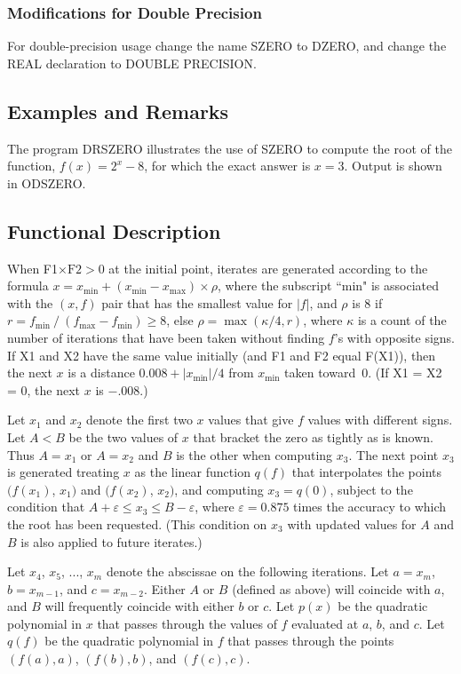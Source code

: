 \documentclass[twoside]{MATH77}
\begin{document}
\subsubsection{Modifications for Double Precision}

For double-precision usage change the name SZERO to DZERO, and change the
REAL declaration to DOUBLE PRECISION.

\subsection{Examples and Remarks}

The program DRSZERO illustrates the use of SZERO to compute the root of the
function, $f(x) = 2^x - 8$, for which the exact answer is $x =
3$. Output is shown in ODSZERO.

\subsection{Functional Description}

When F1$\times \text{F2} > 0$ at the initial point, iterates are generated
according to the formula $x = x_{\min } + (x_{\min } - x_{\max }) \times
\rho$, where the subscript ``min" is associated with the $(x, f)$ pair
that has the smallest value for $|f|$, and $\rho $ is 8 if $r = f_{\min
}\:/\:(f_{\max } - f_{\min }) \geq 8$, else $\rho = \max (\kappa /4, r)$,
where $\kappa $ is a count of the number of iterations that have been
taken without finding $f$'s with opposite signs.  If X1 and X2 have the
same value initially (and F1 and F2 equal F(X1)), then the next $x$ is a
distance $0.008 + |x_{\min }|/4$ from $x_{\min }$ taken toward~0.  (If
X1 = X2 = 0, the next $x$ is $-$.008.)

Let $x_1$ and $x_2$ denote the first two $x$ values that give $f$ values
with different signs. Let $A < B$ be the two values of $x$ that bracket the
zero as tightly as is known. Thus $A = x_1$ or $A = x_2$ and $B$ is the
other when computing $x_3$. The next point $x_3$ is generated treating $x$
as the linear function $q(f)$ that interpolates the points $(f(x_1)$, $x_1)$
and $(f(x_2)$, $x_2)$, and computing $x_3 = q(0)$, subject to the condition
that $A+\varepsilon  \leq x_3 \leq B-\varepsilon $,
where $\varepsilon  = 0.875$ times the accuracy to which the root has been
requested. (This condition on $x_3$ with updated values for $A$ and $B$
is also applied to future iterates.)

Let $x_4$, $x_5$, ..., $x_m$ denote the abscissae on the following
iterations. Let $a = x_m$, $b = x_{m-1}$, and $c = x_{m%
-2}$. Either $A$ or $B$ (defined as above) will coincide with $a$,
and $B$ will frequently coincide with either $b$ or $c$. Let $p(x)$ be the
quadratic polynomial in $x$ that passes through the values of $f$ evaluated
at $a$, $b$, and $c$. Let $q(f)$ be the quadratic polynomial in $f$ that
passes through the points $(f(a), a)$, $(f(b), b)$, and $(f(c), c).$
\end{document}
